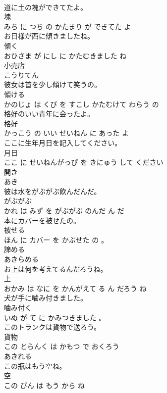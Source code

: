 \documentclass[8pt]{extreport}
\begin{document}
\begin{CJK}{UTF8}{min}
\\	道に土の塊ができてたよ。	
\\	塊 
\\	みち に つち の かたまり が できてた よ			
\\	お日様が西に傾きましたね。	
\\	傾く 
\\	おひさま が にし に かたむきました ね			
\\	小売店	
\\	こうりてん		
\\	彼女は首を少し傾けて笑うの。	
\\	傾ける 
\\	かのじょ は くび を すこし かたむけて わらう の			
\\	格好のいい青年に会ったよ。	
\\	格好 
\\	かっこう の いい せいねん に あった よ			
\\	ここに生年月日を記入してください。	
\\	月日 
\\	ここ に せいねんがっぴ を きにゅう して ください			
\\	開き	
\\	あき		
\\	彼は水をがぶがぶ飲んだんだ。	
\\	がぶがぶ 
\\	かれ は みず を がぶがぶ のんだ ん だ			
\\	本にカバーを被せたの。	
\\	被せる 
\\	ほん に カバー を かぶせた の 。			
\\	諦める	
\\	あきらめる		
\\	お上は何を考えてるんだろうね。	
\\	上 
\\	おかみ は なに を かんがえて る ん だろう ね			
\\	犬が手に噛み付きました。	
\\	噛み付く 
\\	いぬ が て に かみつきました 。			
\\	このトランクは貨物で送ろう。	
\\	貨物 
\\	この とらんく は かもつ で おくろう			
\\	あきれる	
\\	この瓶はもう空ね。	
\\	空 
\\	この びん は もう から ね			

\end{CJK}
\end{document}
